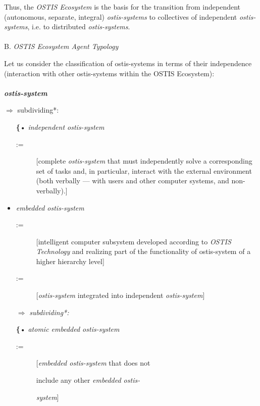 \documentclass[a4paper,10pt]{article}
\begin{document}
\begin{multicols}{2}
Thus, the \textit{OSTIS Ecosystem} is the basis for the transition from independent (autonomous, separate, integral)
\textit{ostis-systems} to collectives of independent \textit{ostis-systems},
i.e. to distributed \textit{ostis-systems}.  \\ \\


\hspace{-0.5cm}B. \textit{OSTIS Ecosystem Agent Typology}


Let us consider the classification of ostis-systems in
terms of their independence (interaction with other ostis-systems within the OSTIS Ecosystem):\\ \\
\textbf{\textit{ostis-system}}


\hspace{-0.5cm}$\Rightarrow$ subdividing*: 
 \begin{itemize}
     \item [\textbf{\{}•] \textit{independent ostis-system}
     \begin{description}
        \item[:=] [complete \textit{ostis-system} that must independently solve a corresponding set of tasks
and, in particular, interact with the external
environment (both verbally — with users and
other computer systems, and non-verbally).]
    \end{description}

     
   \item \textit{embedded ostis-system}
   \begin{description}
        \item[:=] [intelligent computer subsystem developed according to \textit{OSTIS Technology} and realizing
part of the functionality of ostis-system of a
higher hierarchy level]
        \item[:=][\textit{ostis-system} integrated into independent \textit{ostis-system}]
    \end{description}

     $\Rightarrow$ \textit{subdividing*:}
     

\hspace{0.4cm} \textbf{\{}• \textit{atomic embedded ostis-system}
\begin{description}
        \item[\hspace{1cm}:=][\textit{embedded ostis-system} that does not
        \item[]\hspace{1.3cm} include any other \textit{embedded ostis-}
        \item[]\hspace{1.3cm} \textit{system}]
    \end{description}


\end{itemize}
\end{multicols}
\end{document}
